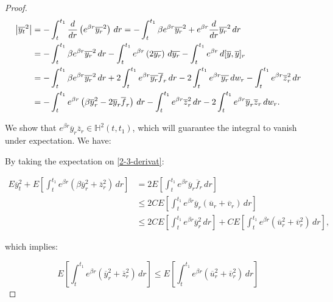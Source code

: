 \begin{theorem}
\begin{proof}
        \begin{align}\label{2-3-derivat}
            \abs{\overline{y_t}^2} & = -\int_t^{t_1} \frac{d}{dr}\left(e^{\beta r}\overline{y_r}^2\right) \,dr = - \int_t^{t_1} \beta e^{\beta r}\overline{y_r}^2 + e^{\beta r}\frac{d}{dr}\overline{y_r}^2 \,dr\\
            & = - \int_t^{t_1} \beta e^{\beta r}\overline{y_r}^2 \,dr - \int_t^{t_1} e^{\beta r}\left(2\overline{y_r}\right)\,d\overline{y_r} - \int_t^{t_1} e^{\beta r}\,d[\overline{y},\overline{y}]_r \\
            & = - \int_t^{t_1} \beta e^{\beta r}\overline{y_r}^2 \,dr + 2\int_t^{t_1} e^{\beta r}\overline{y_r}\overline{f}_r\,dr - 2\int_t^{t_1} e^{\beta r}\overline{y_r}\,dw_r - \int_t^{t_1} e^{\beta r}\overline{z}_r^2\,dr \\
            & = - \int_t^{t_1} e^{\beta r}\left(\beta\overline{y}_r^2-2\overline{y}_r\overline{f}_r\right)\,dr - \int_t^{t_1}e^{\beta r}\overline{z}_r^2\,dr - 2\int_t^{t_1}e^{\beta r}\overline{y}_r\overline{z}_r\,dw_r.
        \end{align}

        We show that $e^{\beta r}\overline{y}_r\overline{z}_r\in\mathbb{H}^2(t,t_1)$, which will guarantee the integral to vanish under expectation. We have:

        
        \color{black}{}
        By taking the expectation on \ref{2-3-derivat}:
        
        \begin{align}
            E\overline{y}_t^2 + E\left[\int_t^{t_1}e^{\beta r} \left(\beta\overline{y}_r^2+\overline{z}_r^2\right)\,dr\right] & = 2E\left[\int_t^{t_1}e^{\beta r}\overline{y}_r\overline{f}_r\,dr\right] \\
            & \leq 2CE\left[\int_t^{t_1}e^{\beta r}\overline{y}_r\left(\overline{u}_r+\overline{v}_r\right)\,dr\right] \\
            & \leq 2CE\left[\int_t^{t_1}e^{\beta r}\overline{y}_r^2\,dr\right] + CE\left[\int_t^{t_1}e^{\beta r}\left(\overline{u}_r^2+\overline{v}_r^2\right)\,dr\right], 
        \end{align}

        which implies:

        \[E\left[\int_t^{t_1}e^{\beta r} \left(\overline{y}_r^2+\overline{z}_r^2\right)\,dr\right] \leq E\left[\int_t^{t_1}e^{\beta r} \left(\overline{u}_r^2+\overline{v}_r^2\right)\,dr\right]\]
    \end{proof}
\end{theorem}
